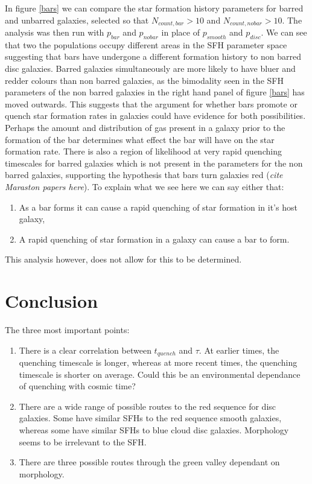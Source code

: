 \documentclass{mn2e}
\begin{document}
In figure \ref{bars} we can compare the star formation history parameters for barred and unbarred galaxies, selected so that $N_{count, bar} > 10$ and $N_{count, no bar} > 10$. The analysis was then run with $p_{bar}$ and $p_{no bar}$ in place of $p_{smooth}$ and $p_{disc}$. We can see that two the populations occupy different areas in the SFH parameter space suggesting that bars have undergone a different formation history to non barred disc galaxies.  Barred galaxies simultaneously are more likely to have bluer and redder colours than non barred galaxies, as the bimodality seen in the SFH parameters of the non barred galaxies in the right hand panel of figure \ref{bars} has moved outwards. This suggests that the argument for whether bars promote or quench star formation rates in galaxies could have evidence for both possibilities. Perhaps the amount and distribution of gas present in a galaxy prior to the formation of the bar determines what effect the bar will have on the star formation rate. There is also a region of likelihood at very rapid quenching timescales for barred galaxies which is not present in the parameters for the non barred galaxies, supporting the hypothesis that bars turn galaxies red (\emph{cite Maraston papers here}). To explain what we see here we can say either that:
\begin{enumerate}[i]
\item As a bar forms it can cause a rapid quenching of star formation in it's host galaxy,
\item A rapid quenching of star formation in a galaxy can cause a bar to form.
\end{enumerate}
This analysis however, does not allow for this to be determined. 

\section{Conclusion}
The three most important points: 
\begin{enumerate}[i]
\item There is a clear correlation between $t_{quench}$ and $\tau$. At earlier times, the quenching timescale is longer, whereas at more recent times, the quenching timescale is shorter on average. Could this be an environmental dependance of quenching with cosmic time?
\item There are a wide range of possible routes to the red sequence for disc galaxies. Some have similar SFHs to the red sequence smooth galaxies, whereas some have similar SFHs to blue cloud disc galaxies. Morphology seems to be irrelevant to the SFH. 
\item There are three possible routes through the green valley dependant on morphology. 
\end{enumerate}
\end{document}
